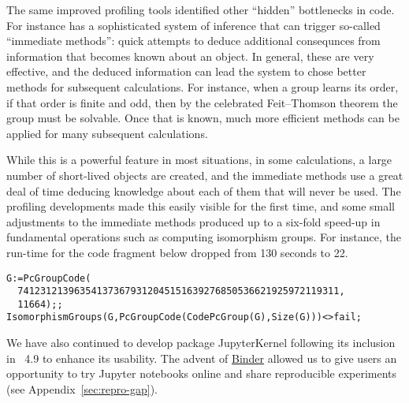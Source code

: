 %
%
%

The same improved profiling tools identified other
``hidden'' bottlenecks in \GAP code. For instance \GAP has a
sophisticated system of inference that can trigger 
so-called ``immediate methods'': quick attempts to deduce additional
consequnces from information that becomes known about an object.
In general, these are very effective, and the deduced information can
lead the system to chose better methods for subsequent
calculations. For instance, when a group learns its order, if that
order is finite and odd, then by the celebrated
Feit--Thomson theorem the group must be solvable. Once that
is known, much more efficient methods can be applied for many
subsequent calculations.

While this is a powerful feature in most situations, in some
calculations, a large number of short-lived objects are created,
and the immediate methods use a great deal of time deducing knowledge
about each of them
that will never be used. The profiling developments made this 
easily visible for the first time, and some small adjustments to the
immediate methods produced up to a six-fold speed-up in fundamental
operations such as computing isomorphism groups. For instance, the
run-time for the code fragment below dropped from 130
seconds to 22.


{\Small
\begin{verbatim}
G:=PcGroupCode( 
  741231213963541373679312045151639276850536621925972119311,
  11664);;
IsomorphismGroups(G,PcGroupCode(CodePcGroup(G),Size(G)))<>fail;
\end{verbatim}
}


We have also continued to develop package {\sf JupyterKernel} following 
its inclusion in \GAP~4.9 to enhance its usability. The advent of
\href{https://mybinder.org/}{Binder} allowed us to give users an
opportunity to try \GAP Jupyter notebooks online 
and share reproducible \GAP experiments (see Appendix~\ref{sec:repro-gap}).

